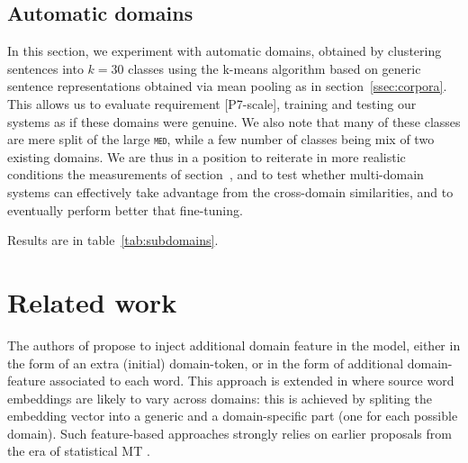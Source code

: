 \documentclass[11pt]{article}
\newcommand{\fyTodo}[1]{\Todo[FY:]{\textcolor{orange}{#1}}}
\newcommand{\domain}[1]{\texttt{\textsc{#1}}}
\begin{document}
\subsection{Automatic domains \label{ssec:autodomains}}
In this section, we experiment with automatic domains, obtained by clustering sentences into $k=30$ classes using the k-means algorithm based on generic sentence representations obtained via mean pooling as in section~\ref{ssec:corpora}. This allows us to evaluate requirement [P7-scale], training and testing our systems as if these domains were genuine. We also note that many of these classes are mere split of the large \domain{med}, while a few number of classes being mix of two existing domains. We are thus in a position to reiterate in more realistic conditions the measurements of section~\label{ssec:}, and to test whether multi-domain systems can effectively take advantage from the cross-domain similarities, and to eventually perform better that fine-tuning.

Results are in table~\ref{tab:subdomains}.\fyTodo{Fill the tables with automatic and existing domains - we will have significancy results for the existing domains, for the other may be for larger classes we will have enough test instances?}

\section{Related work \label{sec:related}}

The authors of \cite{Kobus17domaincontrol} propose to inject additional domain feature in the model, either in the form of an extra (initial) domain-token, or in the form of additional domain-feature associated to each word. This approach is extended in \cite{Pham19generic} where source word embeddings are likely to vary across domains: this is achieved by spliting the embedding vector into a generic and a domain-specific part (one for each possible domain). Such feature-based approaches strongly relies on earlier proposals from the era of statistical MT \cite{Daume07frustratingly,Clark12onesystem}.
\end{document}

